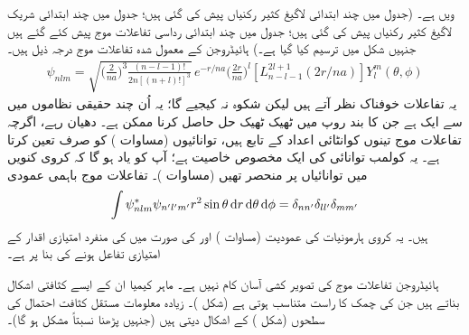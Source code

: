   ویں  ہے۔ (جدول  میں چند ابتدائی لاگیغ  کثیر رکنیاں  پیش کی گئی ہیں؛ جدول  میں چند ابتدائی شریک لاگیغ  کثیر رکنیاں پیش کی  گئی ہیں؛  جدول  میں چند ابتدائی رداسی تفاعلات موج پیش کئے گئے ہیں جنہیں شکل    میں ترسیم کیا گیا ہے۔) ہائیڈروجن کے معمول شدہ تفاعلات موج درجہ ذیل ہیں۔
  \begin{align}\label{مساوات_تین_ابعادی_ہائیڈروجن_تفاعلات_موج}
\psi_{nlm}=\sqrt{\big(\frac{2}{na}\big)^3\frac{(n-l-1)!}{2n[(n+l)!]^{3}}}\,e^{-r/na}\big(\frac{2r}{na}\big)^{l}[L_{n-l-1}^{2l+1}(2r/na)]Y_{l}^{m}(\theta,\phi)
\end{align}
یہ تفاعلات خوفناک نظر آتے ہیں لیکن شکوہ  نہ کیجیے گا؛ یہ اُن چند حقیقی نظاموں میں سے ایک ہے جن کا  بند روپ میں ٹھیک ٹھیک حل حاصل کرنا ممکن ہے۔  دھیان رہے، اگرچہ تفاعلات موج تینوں کوانٹائی اعداد کے تابع ہیں، توانائیوں (مساوات ) کو صرف  تعین کرتا ہے۔ یہ کولمب توانائی کی ایک مخصوص خاصیت ہے؛ آپ کو یاد ہو گا کہ کروی کنویں  میں توانائیاں  پر منحصر تھیں (مساوات )۔ تفاعلات موج باہمی عمودی 
\begin{align}
\int\psi_{nlm}^{*}\psi_{n'l'm'}r^{2}\sin\theta\dif r\dif\theta\dif\phi=\delta_{nn'}\delta_{ll'}\delta_{mm'} 
\end{align}
ہیں۔ یہ کروی ہارمونیات کی عمودیت (مساوات )  اور  کی صورت میں   کی منفرد امتیازی  اقدار کے امتیازی تفاعل ہونے کی بنا پر ہے۔

ہائیڈروجن تفاعلات موج کی تصویر کشی آسان کام نہیں ہے۔  ماہر کیمیا ان کے ایسے کثافتی اشکال بناتے ہیں جن کی چمک    کا راست متناسب ہوتی ہے (شکل )۔ زیادہ معلومات مستقل کثافت احتمال کی سطحوں (شکل ) کے اشکال دیتی ہیں (جنہیں پڑھنا  نسبتاً مشکل ہو گا)۔


